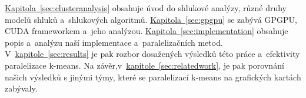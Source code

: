 \hyperref[sec:clusteranalysis]{Kapitola~\ref*{sec:clusteranalysis}} obsahuje úvod do shlukové analýzy, různé druhy modelů shluků a~shlukových algoritmů. \hyperref[sec:gpgpu]{Kapitola~\ref*{sec:gpgpu}} se zabývá GPGPU, CUDA frameworkem a~jeho analýzou. \hyperref[sec:implementation]{Kapitola~\ref*{sec:implementation}} obsahuje popis a~analýzu naší implementace a~paralelizačních metod. V~\hyperref[sec:results]{kapitole~\ref*{sec:results}} je pak rozbor dosažených výsledků této práce a~efektivity paralelizace k-means. Na závěr,v~\hyperref[sec:relatedwork]{kapitole~\ref*{sec:relatedwork}}, je pak porovnání našich výsledků s jinými týmy, které se paralelizací k-means na grafických kartách zabývaly. 